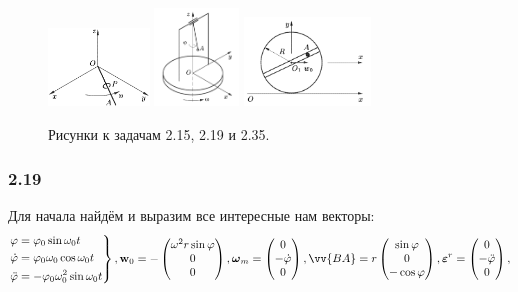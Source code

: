 \begin{figure}[h]
    \centering
    \includegraphics[width=0.24\textwidth]{img/2_15.png}
    \hspace{1cm} 
    \includegraphics[width=0.2\textwidth]{img/2_19.png}
    \hspace{1cm} 
    \includegraphics[width=0.3\textwidth]{img/2_35.png}
    \caption{Рисунки к задачам 2.15, 2.19 и 2.35.}
\end{figure}

\subsubsection*{2.19}

Для начала найдём и выразим все интересные нам векторы:
$$
    \left.\begin{aligned}
        \varphi         &= \varphi_0 \sin \omega_0 t            \\
        \dot{\varphi}   &= \varphi_0 \omega_0 \cos \omega_0 t   \\
        \ddot{\varphi}  &= - \varphi_0 \omega_0^2 \sin \omega_0 t \\
    \end{aligned}\right\},
    \vc{\mathrm{w}}_0 = - \begin{pmatrix}
        \omega^2 r \sin \varphi \\ 0 \\ 0
    \end{pmatrix},
    \vc{\omega}_m = \begin{pmatrix}
        0 \\ - \dot{\varphi} \\ 0
    \end{pmatrix},
    \vv{BA} = r \begin{pmatrix}
        \sin \varphi \\ 0 \\ - \cos \varphi
    \end{pmatrix},
    \vc{\varepsilon}^r = \begin{pmatrix}
        0 \\ -\ddot{\varphi} \\ 0
    \end{pmatrix},
$$

